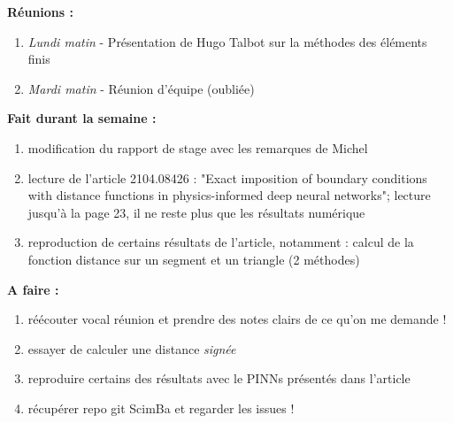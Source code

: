 \textbf{Réunions :}
\begin{enumerate}[label=\textbullet]
	\item \textit{Lundi matin} -  Présentation de Hugo Talbot sur la méthodes des éléments finis
	\item \textit{Mardi matin} - Réunion d'équipe (oubliée)
\end{enumerate}
\textbf{Fait durant la semaine :}
\begin{enumerate}[label=\textbullet]
	\item modification du rapport de stage avec les remarques de Michel
	\item lecture de l'article 2104.08426 : "Exact imposition of boundary conditions with distance functions in physics-informed deep neural networks"; lecture jusqu'à la page 23, il ne reste plus que les résultats numérique
	\item reproduction de certains résultats de l'article, notamment : calcul de la fonction distance sur un segment et un triangle (2 méthodes)
\end{enumerate}

\textbf{A faire :}
\begin{enumerate}[label=\textbullet]
	\item réécouter vocal réunion et prendre des notes clairs de ce qu'on me demande !
	\item essayer de calculer une distance \textit{signée}
	\item reproduire certains des résultats avec le PINNs présentés dans l'article
	\item récupérer repo git ScimBa et regarder les issues !
\end{enumerate}